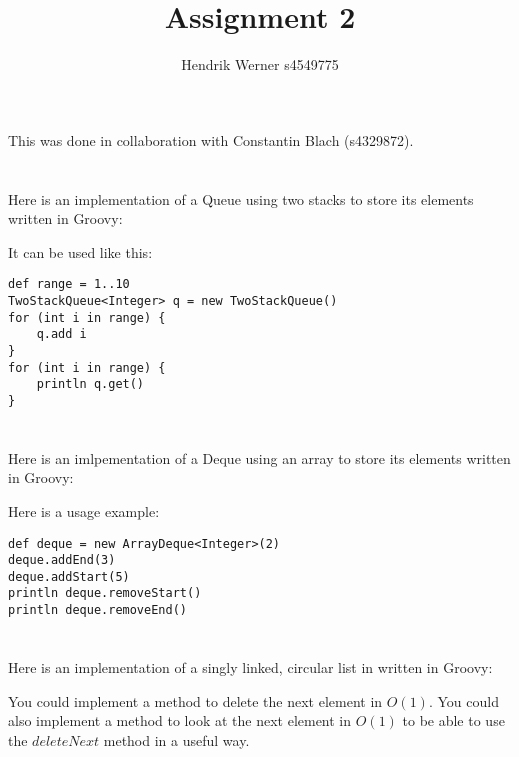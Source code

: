 \documentclass[12pt]{article}
\title {Assignment 2}
\author {Hendrik Werner s4549775}
\begin{document}
\maketitle

This was done in collaboration with Constantin Blach (s4329872).

\section{} %
Here is an implementation of a Queue using two stacks to store its elements written in Groovy:



It can be used like this:

\begin{lstlisting}
def range = 1..10
TwoStackQueue<Integer> q = new TwoStackQueue()
for (int i in range) {
    q.add i
}
for (int i in range) {
    println q.get()
}
\end{lstlisting}

\section{} %
Here is an imlpementation of a Deque using an array to store its elements written in Groovy:



Here is a usage example:

\begin{lstlisting}
def deque = new ArrayDeque<Integer>(2)
deque.addEnd(3)
deque.addStart(5)
println deque.removeStart()
println deque.removeEnd()
\end{lstlisting}

\section{} %
Here is an implementation of a singly linked, circular list in written in Groovy:



You could implement a method to delete the next element in $O(1)$. You could also implement a method to look at the next element in $O(1)$ to be able to use the $deleteNext$ method in a useful way.

\section{} %
\section{} %
\section{} %
\end{document}
